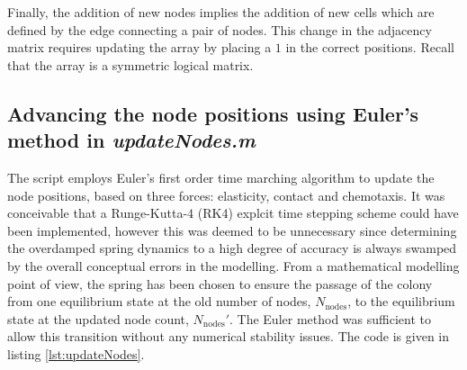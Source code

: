Finally, the addition of new nodes implies the addition of new cells which 
are defined by the edge connecting a pair of nodes. This 
change in the adjacency matrix requires updating the 
array by placing a $1$ in the correct positions. Recall that 
the  array is a symmetric logical matrix.

\subsection{Advancing the node positions using Euler's method in \textit{updateNodes.m}} \label{ssec:updatenodes}
The  script employs Euler's first order
time marching algorithm to update the node positions, 
based on three forces: elasticity, contact and chemotaxis. 
It was conceivable that a Runge-Kutta-$4$ (RK4) explcit time stepping scheme 
could have been implemented, however this was deemed to be unnecessary since
determining the overdamped spring dynamics to a high degree of accuracy 
is always swamped by the overall conceptual errors in the modelling. 
From a mathematical modelling point of view, the spring has been 
chosen to ensure the passage of the colony from one equilibrium state 
at the old number of nodes, $N_{\textrm{nodes}}$, to the equilibrium state 
at the updated node count, $N_{\textrm{nodes}}'$. The Euler method 
was sufficient to allow this transition without 
any numerical stability issues. The code is given  in listing \ref{lst:updateNodes}.

